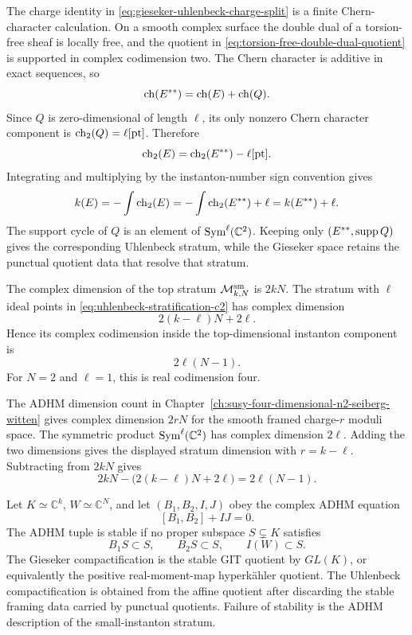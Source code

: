 The charge identity in
\eqref{eq:gieseker-uhlenbeck-charge-split} is a finite Chern-character
calculation.  On a smooth complex surface the double dual of a torsion-free
sheaf is locally free, and the quotient in
\eqref{eq:torsion-free-double-dual-quotient} is supported in complex
codimension two.  The Chern character is additive in exact sequences, so
\[
  {\rm ch}(E^{\ast\ast})={\rm ch}(E)+{\rm ch}(Q).
\]
Since \(Q\) is zero-dimensional of length \(\ell\), its only nonzero Chern
character component is \({\rm ch}_2(Q)=\ell[{\rm pt}]\).  Therefore
\[
  {\rm ch}_2(E)={\rm ch}_2(E^{\ast\ast})-\ell[{\rm pt}].
\]
Integrating and multiplying by the instanton-number sign convention gives
\[
  k(E)
  =
  -\int{\rm ch}_2(E)
  =
  -\int{\rm ch}_2(E^{\ast\ast})+\ell
  =
  k(E^{\ast\ast})+\ell .
\]
The support cycle of \(Q\) is an element of
\({\rm Sym}^{\ell}(\mathbb C^2)\).  Keeping only
\((E^{\ast\ast},{\rm supp}\,Q)\) gives the corresponding Uhlenbeck stratum,
while the Gieseker space retains the punctual quotient data that resolve that
stratum.

\begin{remark}
\label{rem:uhlenbeck-stratum-dimension}
The complex dimension of the top stratum
\(\mathcal M_{k,N}^{\rm sm}\) is \(2kN\).  The stratum with \(\ell\) ideal
points in \eqref{eq:uhlenbeck-stratification-c2} has complex dimension
\[
  2(k-\ell)N+2\ell .
\]
Hence its complex codimension inside the top-dimensional instanton
component is
\begin{equation}
  2\ell(N-1).
  \label{eq:uhlenbeck-stratum-codimension}
\end{equation}
For \(N=2\) and \(\ell=1\), this is real codimension four.

The ADHM dimension count in
Chapter~\ref{ch:susy-four-dimensional-n2-seiberg-witten} gives complex dimension
\(2rN\) for the smooth framed charge-\(r\) moduli space.  The symmetric
product \({\rm Sym}^{\ell}(\mathbb C^2)\) has complex dimension \(2\ell\).
Adding the two dimensions gives the displayed stratum dimension with
\(r=k-\ell\).  Subtracting from \(2kN\) gives
\[
  2kN-\bigl(2(k-\ell)N+2\ell\bigr)=2\ell(N-1).
\]
\end{remark}

\begin{definition}
\label{def:adhm-stability-small-instanton}
Let \(K\simeq\mathbb C^k\), \(W\simeq\mathbb C^N\), and let
\((B_1,B_2,I,J)\) obey the complex ADHM equation
\[
  [B_1,B_2]+IJ=0 .
\]
The ADHM tuple is stable if no proper subspace
\(S\subsetneq K\) satisfies
\[
  B_1S\subset S,\qquad B_2S\subset S,\qquad I(W)\subset S .
\]
The Gieseker compactification is the stable GIT quotient by \(GL(K)\), or
equivalently the positive real-moment-map hyperkähler quotient.  The
Uhlenbeck compactification is obtained from the affine quotient after
discarding the stable framing data carried by punctual quotients.  Failure
of stability is the ADHM description of the small-instanton stratum.
\end{definition}


